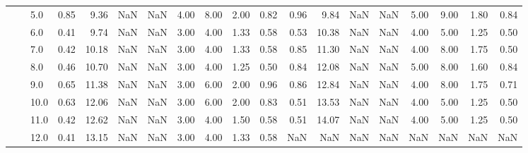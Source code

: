 \begin{tabular}{lllrrrrrrrrrrrrrrrr}
       &     & 5.0  &      0.85 &       9.36 &               NaN &                NaN & 4.00 &   8.00 &             2.00 &                         0.82 &      0.96 &       9.84 &               NaN &                NaN & 5.00 &   9.00 &             1.80 &                         0.84 \\
       &     & 6.0  &      0.41 &       9.74 &               NaN &                NaN & 3.00 &   4.00 &             1.33 &                         0.58 &      0.53 &      10.38 &               NaN &                NaN & 4.00 &   5.00 &             1.25 &                         0.50 \\
       &     & 7.0  &      0.42 &      10.18 &               NaN &                NaN & 3.00 &   4.00 &             1.33 &                         0.58 &      0.85 &      11.30 &               NaN &                NaN & 4.00 &   8.00 &             1.75 &                         0.50 \\
       &     & 8.0  &      0.46 &      10.70 &               NaN &                NaN & 3.00 &   4.00 &             1.25 &                         0.50 &      0.84 &      12.08 &               NaN &                NaN & 5.00 &   8.00 &             1.60 &                         0.84 \\
       &     & 9.0  &      0.65 &      11.38 &               NaN &                NaN & 3.00 &   6.00 &             2.00 &                         0.96 &      0.86 &      12.84 &               NaN &                NaN & 4.00 &   8.00 &             1.75 &                         0.71 \\
       &     & 10.0 &      0.63 &      12.06 &               NaN &                NaN & 3.00 &   6.00 &             2.00 &                         0.83 &      0.51 &      13.53 &               NaN &                NaN & 4.00 &   5.00 &             1.25 &                         0.50 \\
       &     & 11.0 &      0.42 &      12.62 &               NaN &                NaN & 3.00 &   4.00 &             1.50 &                         0.58 &      0.51 &      14.07 &               NaN &                NaN & 4.00 &   5.00 &             1.25 &                         0.50 \\
       &     & 12.0 &      0.41 &      13.15 &               NaN &                NaN & 3.00 &   4.00 &             1.33 &                         0.58 &       NaN &        NaN &               NaN &                NaN &  NaN &    NaN &              NaN &                          NaN \\

\end{tabular}
